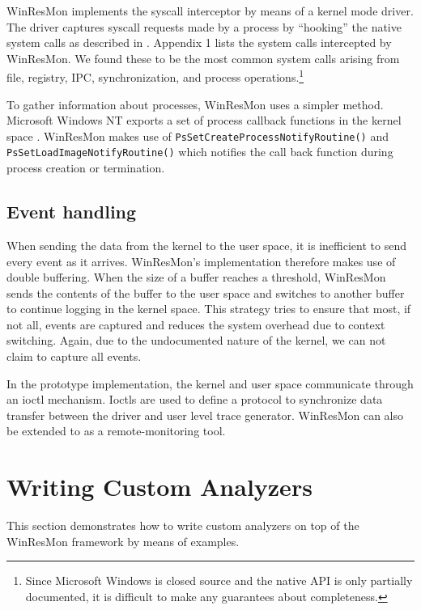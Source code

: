 WinResMon implements the syscall interceptor by means of a kernel mode driver.
The driver captures syscall requests made by a process by ``hooking'' the
native system calls as described in \cite{nthooking}.  Appendix 1 lists the
system calls intercepted by WinResMon.  We found these to be the most common
system calls arising from file, registry, IPC, synchronization, and process
operations.\footnote{ Since Microsoft Windows is closed source and the native
API is only partially documented, it is difficult to make any guarantees about
completeness.  }

To gather information about processes, WinResMon uses a simpler method.
Microsoft Windows NT exports a set of process callback functions in the kernel
space \cite{MSDN}.  WinResMon makes use of {\small\tt PsSetCreateProcessNotifyRoutine()} and
{\small\tt PsSetLoadImageNotifyRoutine()} which notifies the call back function
during process creation or termination.


\subsection{Event handling}

When sending the data from the kernel to the user space, it is inefficient to
send every event as it arrives.  WinResMon's implementation therefore makes use
of double buffering.  When the size of a buffer reaches a threshold, WinResMon
sends the contents of the buffer to the user space and switches to another
buffer to continue logging in the kernel space.  This strategy tries to ensure
that most, if not all, events are captured and reduces the system overhead due
to context switching.  Again, due to the undocumented nature of the kernel, we
can not claim to capture all events.

In the prototype implementation, the kernel and user space communicate through
an ioctl mechanism. Ioctls are used to define a protocol 
to synchronize data transfer between the driver and 
user level trace generator.
WinResMon can also be extended to as a remote-monitoring tool.


\section{Writing Custom Analyzers}
\label{sect:sample}

This section demonstrates how to write custom analyzers on top of the WinResMon
framework by means of examples.

